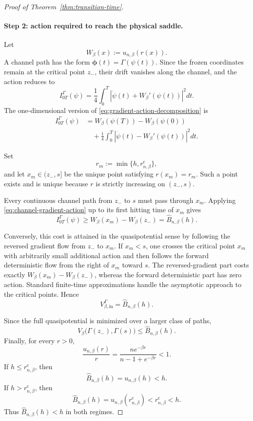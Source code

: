 \documentclass{article}
\theoremstyle{plain}
\theoremstyle{definition}
\theoremstyle{remark}
\begin{document}
\begin{proof}[Proof of Theorem~\ref{thm:transition-time}]
\paragraph{Step 2: action required to reach the physical saddle.}
Let
\[
    W_\beta(x):=u_{n,\beta}(r(x)).
\]
A channel path has the form
\(\boldsymbol\phi(t)=\Gamma(\psi(t))\). Since the frozen coordinates remain at the critical point \(z_-\), their drift vanishes along the channel, and the action reduces to
\begin{equation}
    I_{0T}^{\Gamma}(\psi)
    =
    \frac14\int_0^T
    \left|
        \dot\psi(t)+W_\beta'(\psi(t))
    \right|^2dt.
    \label{eq:channel-action}
\end{equation}
The one-dimensional version of \eqref{eq:gradient-action-decomposition} is
\begin{equation}
\begin{aligned}
    I_{0T}^{\Gamma}(\psi)
    &=
    W_\beta(\psi(T))-W_\beta(\psi(0))
    \\
    &\quad+
    \frac14\int_0^T
    \left|
        \dot\psi(t)-W_\beta'(\psi(t))
    \right|^2dt.
\end{aligned}
\label{eq:channel-gradient-action}
\end{equation}

Set
\[
    r_m:=\min\{h,r_{n,\beta}^{\mathrm c}\},
\]
and let \(x_m\in(z_-,s]\) be the unique point satisfying
\(r(x_m)=r_m\). Such a point exists and is unique because \(r\) is strictly increasing on \((z_-,s)\).

Every continuous channel path from \(z_-\) to \(s\) must pass through \(x_m\). Applying \eqref{eq:channel-gradient-action} up to its first hitting time of \(x_m\) gives
\[
    I_{0T}^{\Gamma}(\psi)
    \ge
    W_\beta(x_m)-W_\beta(z_-)
    =
    \widehat B_{n,\beta}(h).
\]

Conversely, this cost is attained in the quasipotential sense by following the reversed gradient flow from \(z_-\) to \(x_m\). If \(x_m<s\), one crosses the critical point \(x_m\) with arbitrarily small additional action and then follows the forward deterministic flow from the right of \(x_m\) toward \(s\). The reversed-gradient part costs exactly
\(W_\beta(x_m)-W_\beta(z_-)\), whereas the forward deterministic part has zero action. Standard finite-time approximations handle the asymptotic approach to the critical points. Hence
\[
    V_{\beta,\mathrm{in}}^\Gamma
    =
    \widehat B_{n,\beta}(h).
\]

Since the full quasipotential is minimized over a larger class of paths,
\[
    V_\beta\bigl(\Gamma(z_-),\Gamma(s)\bigr)
    \le
    \widehat B_{n,\beta}(h).
\]
Finally, for every \(r>0\),
\[
    \frac{u_{n,\beta}(r)}{r}
    =
    \frac{ne^{-\beta r}}{n-1+e^{-\beta r}}
    <1.
\]
If \(h\le r_{n,\beta}^{\mathrm c}\), then
\[
    \widehat B_{n,\beta}(h)=u_{n,\beta}(h)<h.
\]
If \(h>r_{n,\beta}^{\mathrm c}\), then
\[
    \widehat B_{n,\beta}(h)
    =
    u_{n,\beta}(r_{n,\beta}^{\mathrm c})
    <
    r_{n,\beta}^{\mathrm c}
    <
    h.
\]
Thus \(\widehat B_{n,\beta}(h)<h\) in both regimes.


\end{proof}
\end{document}
